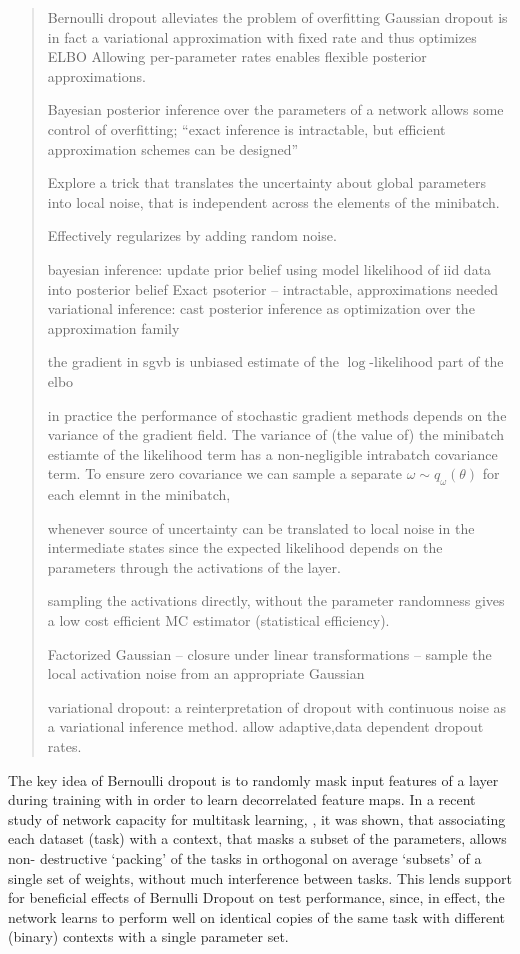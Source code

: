 \documentclass[a4paper,10pt]{article}
\begin{document}
\begin{quote}
Bernoulli dropout alleviates the problem of overfitting
Gaussian dropout is in fact a variational approximation with fixed rate and thus optimizes ELBO
Allowing per-parameter rates enables flexible posterior approximations.

Bayesian posterior inference over the parameters of a network allows some control of overfitting;
``exact inference is intractable, but efficient approximation schemes can be designed''

Explore a trick that translates the uncertainty about global parameters into local noise, that
is independent across the elements of the minibatch.

Effectively regularizes by adding random noise.

bayesian inference: update prior belief using model likelihood of iid data into posterior belief
Exact psoterior -- intractable, approximations needed
variational inference: cast posterior inference as optimization over the approximation family

the gradient in sgvb is unbiased estimate of the $\log$-likelihood part of the elbo

in practice the performance of stochastic gradient methods depends on the variance of the gradient
field. The variance of (the value of) the minibatch estiamte of the likelihood term has a
non-negligible intrabatch covariance term. To ensure zero covariance we can sample a separate
$\omega\sim q_\omega(\theta)$ for each elemnt in the minibatch, 

whenever source of uncertainty can be translated to local noise in the intermediate states
since the expected likelihood depends on the parameters through the activations of the layer.

sampling the activations directly, without the parameter randomness gives a low cost efficient
MC estimator (statistical efficiency).

Factorized Gaussian -- closure under linear transformations -- sample the local activation noise
from an appropriate Gaussian 

variational dropout: a reinterpretation of dropout with continuous noise as a variational inference
method. allow adaptive,data dependent dropout rates.

\end{quote}


The key idea of Bernoulli dropout is to randomly mask input features of a layer during
training with in order to learn decorrelated feature maps. In a recent study of network
capacity for multitask learning, \cite{multitask2019}, it was shown, that associating
each dataset (task) with a context, that masks a subset of the parameters, allows non-%
destructive `packing' of the tasks in orthogonal on average `subsets' of a single set
of weights, without much interference between tasks. This lends support for beneficial
effects of Bernulli Dropout on test performance, since, in effect, the network learns
to perform well on identical copies of the same task with different (binary) contexts
with a single parameter set.
\end{document}
